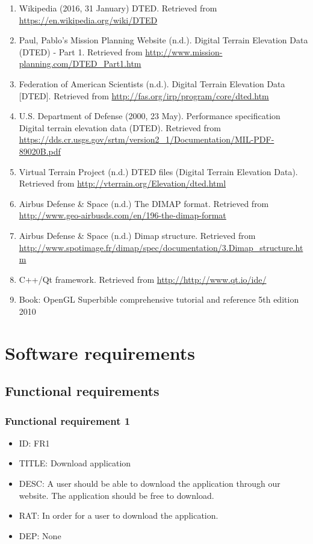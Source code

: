 \documentclass[11pt]{article}
\begin{document}
\begin{enumerate}[{(1)}]
\item Wikipedia (2016, 31 January) DTED. Retrieved from \url{https://en.wikipedia.org/wiki/DTED}

\item Paul, Pablo's Mission Planning Website (n.d.). Digital Terrain Elevation Data (DTED) - Part 1. Retrieved from \url{http://www.mission-planning.com/DTED_Part1.htm}

\item Federation of American Scientists (n.d.). Digital Terrain Elevation Data [DTED]. Retrieved from \url{http://fas.org/irp/program/core/dted.htm}
 
\item U.S. Department of Defense (2000, 23 May). Performance specification Digital terrain elevation data (DTED). Retrieved from \url{https://dds.cr.usgs.gov/srtm/version2_1/Documentation/MIL-PDF-89020B.pdf}

\item Virtual Terrain Project (n.d.) DTED files (Digital Terrain Elevation Data). Retrieved from \url{http://vterrain.org/Elevation/dted.html}


\item Airbus Defense \& Space (n.d.) The DIMAP format. Retrieved from \url{http://www.geo-airbusds.com/en/196-the-dimap-format}

\item Airbus Defense \& Space (n.d.) Dimap structure. Retrieved from \url{http://www.spotimage.fr/dimap/spec/documentation/3.Dimap_structure.htm}

\item C++/Qt framework. Retrieved from \url{http://http://www.qt.io/ide/}

\item Book: OpenGL Superbible comprehensive tutorial and reference 5th edition 2010
\end{enumerate}

\section{Software requirements}
\subsection{Functional requirements}
\subsubsection{Functional requirement 1}
\begin{itemize}
\item ID: FR1
\item TITLE: Download application
\item DESC: A user should be able to download the application through our website. The application should be free to download.
\item RAT: In order for a user to download the application.
\item DEP: None
\end{itemize}
\end{document}
